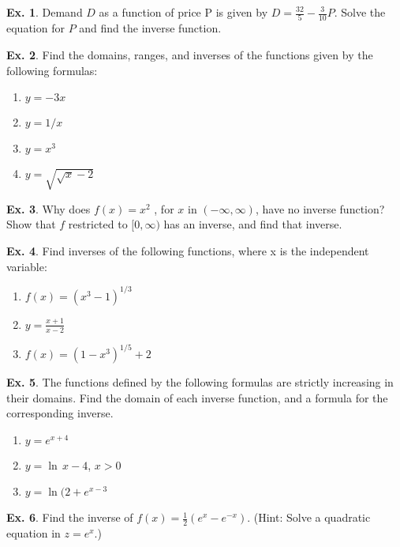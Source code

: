 \documentclass[10pt,a4paper]{book}
\theoremstyle{definition}\newtheorem{definition}{Definition}
\theoremstyle{definition}\newtheorem{fact}{Fact}
\theoremstyle{definition}\newtheorem{ex}{Ex.}
\theoremstyle{definition}\newtheorem{project}{Project}
\theoremstyle{definition}\newtheorem{problem}{Problem}
\theoremstyle{definition}\newtheorem{example}{Example}
\numberwithin{theorem}{chapter}
\numberwithin{corollary}{chapter}
\numberwithin{assumption}{chapter}
\numberwithin{definition}{chapter}
\numberwithin{prop}{chapter}
\numberwithin{notation}{chapter}
\numberwithin{problem}{chapter}
\numberwithin{example}{chapter}
\numberwithin{fact}{chapter}
\numberwithin{ex}{chapter}
\begin{document}
	\begin{ex}
		Demand $D$ as a function of price P is given by $D=\frac{32}{5}- \frac{3}{10}P$. Solve the equation for $P$ and find the inverse function.
	\end{ex}
	
	\begin{ex}
		Find the domains, ranges, and inverses of the functions given by the following formulas: 
		\begin{enumerate}[label=(\alph*)]
			\item $y=-3x$
			\item $y=1/x$
			\item $y=x^3$
			\item $y=\sqrt{\sqrt{x}-2}$
		\end{enumerate}
	\end{ex}
	
	\begin{ex}
		Why does $f (x) = x^2$ , for $x$ in $(-\infty, \infty)$, have no inverse function? Show that $f$ restricted to $[0, \infty)$ has an inverse, and find that inverse.
	\end{ex}
	
	\begin{ex}
		Find inverses of the following functions, where x is the independent variable:
		\begin{enumerate}[label=(\alph*)]
			\item $f(x)=(x^3 -1)^{1/3}$
			\item $y=\frac{x+1}{x-2}$
			\item $f(x)=(1-x^3)^{1/5} +2$
		\end{enumerate}
	\end{ex}
	
	\begin{ex}
		The functions defined by the following formulas are strictly increasing in their domains. Find the domain of each inverse function, and a formula for the corresponding inverse.
		\begin{enumerate}[label=(\alph*)]
			\item $y=e^{x+4}$
			\item $y=\ln\,x-4$, $x>0$
			\item $y=\ln(2+e^{x-3}$
		\end{enumerate}
	\end{ex}
	
	\begin{ex}
		Find the inverse of $f (x) = \frac{1}{2} (e^{x} - e^{-x} )$. (Hint: Solve a quadratic equation in $z = e^{x}$.)
	\end{ex}
	
\end{document}

